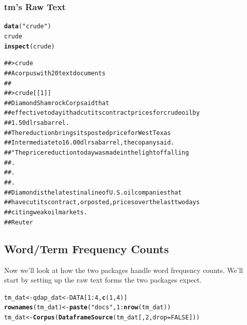 \documentclass{article}\usepackage[]{graphicx}\usepackage[]{color}
\makeatletter
\newcommand{\hlnum}[1]{\textcolor[rgb]{0.686,0.059,0.569}{#1}}%
\newcommand{\hlstr}[1]{\textcolor[rgb]{0.192,0.494,0.8}{#1}}%
\newcommand{\hlopt}[1]{\textcolor[rgb]{0,0,0}{#1}}%
\newcommand{\hlstd}[1]{\textcolor[rgb]{0.345,0.345,0.345}{#1}}%
\newcommand{\hlkwb}[1]{\textcolor[rgb]{0.69,0.353,0.396}{#1}}%
\newcommand{\hlkwc}[1]{\textcolor[rgb]{0.333,0.667,0.333}{#1}}%
\newcommand{\hlkwd}[1]{\textcolor[rgb]{0.737,0.353,0.396}{\textbf{#1}}}%
\newenvironment{kframe}{%
 \def\at@end@of@kframe{}%
 \ifinner\ifhmode%
  \def\at@end@of@kframe{\end{minipage}}%
  \begin{minipage}{\columnwidth}%
 \fi\fi%
 \def\FrameCommand##1{\hskip\@totalleftmargin \hskip-\fboxsep
 \colorbox{shadecolor}{##1}\hskip-\fboxsep
     \hskip-\linewidth \hskip-\@totalleftmargin \hskip\columnwidth}%
 \MakeFramed {\advance\hsize-\width
   \@totalleftmargin\z@ \linewidth\hsize
   \@setminipage}}%
 {\par\unskip\endMakeFramed%
 \at@end@of@kframe}
\newenvironment{knitrout}{}{} %
\makeatother
\begin{document}
\subsubsection{tm's Raw Text}
\begin{knitrout}
\color{fgcolor}\begin{kframe}
\begin{alltt}
\hlkwd{data}\hlstd{(}\hlstr{"crude"}\hlstd{)}
\hlstd{crude}
\hlkwd{inspect}\hlstd{(crude)}
\end{alltt}
\end{kframe}
\end{knitrout}


\begin{knitrout}
\color{fgcolor}\begin{kframe}
\begin{alltt}
## > crude
## A corpus with 20 text documents
## 
## > crude[[1]]
## Diamond Shamrock Corp said that
## effective today it had cut its contract prices for crude oil by
## 1.50 dlrs a barrel.
##     The reduction brings its posted price for West Texas
## Intermediate to 16.00 dlrs a barrel, the copany said.
##     "The price reduction today was made in the light of falling
## .
## .
## .
##     Diamond is the latest in a line of U.S. oil companies that
## have cut its contract, or posted, prices over the last two days
## citing weak oil markets.
##  Reuter
\end{alltt}
\end{kframe}
\end{knitrout}

\subsection{Word/Term Frequency Counts}

\hspace{.4cm} Now we'll look at how the two packages handle word frequency counts.  We'll start by setting up the raw text forms the two packages expect.

\begin{knitrout}
\color{fgcolor}\begin{kframe}
\begin{alltt}
\hlstd{tm_dat} \hlkwb{<-} \hlstd{qdap_dat} \hlkwb{<-} \hlstd{DATA[}\hlnum{1}\hlopt{:}\hlnum{4}\hlstd{,} \hlkwd{c}\hlstd{(}\hlnum{1}\hlstd{,} \hlnum{4}\hlstd{) ]}
\hlkwd{rownames}\hlstd{(tm_dat)} \hlkwb{<-} \hlkwd{paste}\hlstd{(}\hlstr{"docs"}\hlstd{,} \hlnum{1}\hlopt{:}\hlkwd{nrow}\hlstd{(tm_dat))}
\hlstd{tm_dat} \hlkwb{<-} \hlkwd{Corpus}\hlstd{(}\hlkwd{DataframeSource}\hlstd{(tm_dat[,} \hlnum{2}\hlstd{,} \hlkwc{drop}\hlstd{=}\hlnum{FALSE}\hlstd{]))}
\end{alltt}
\end{kframe}
\end{knitrout}
\end{document}
